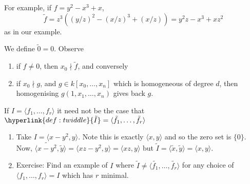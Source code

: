 \documentclass{article}
\begin{document}
For example, if $f = y^2 - x^3 + x$,
\begin{equation*}
    \tilde{f} = z^3 ((y/z)^2 - (x/z)^3 + (x/z)) = y^2 z - x^3 + x z^2
\end{equation*}
as in our example.

We define $\tilde{0} = 0$.
Observe
\begin{enumerate}[label=(\roman*)]
    \item if $f \neq 0$, then $x_0 \nmid \tilde{f}$, and conversely
    \item if $x_0 \nmid g$, and $g \in k[x_0, \dotsc, x_n]$ which is homogeneous of degree $d$, then homogenising $g(1, x_1, \dotsc, x_n)$ gives back $g$.
\end{enumerate}
\begin{warning}
    If $I = \langle f_1, \dotsc, f_r \rangle$ it need not be the case that $\hyperlink{def:twiddle}{\tilde{I}} = \langle \tilde{f_1}, \dotsc, \tilde{f_r}\rangle$
\end{warning}
\begin{eg}\leavevmode
    \begin{enumerate}[label=(\roman*)]
        \item Take $I = \langle x - y^2, y \rangle$.
            Note this is exactly $\langle x, y \rangle$ and so the zero set is $\{0\}$.
            Now, $\langle \widetilde{x - y^2}, \tilde{y} \rangle = \langle xz - y^2, y \rangle = \langle xz, y\rangle$ but $\tilde{I} = \langle \tilde{x}, \tilde{y} \rangle = \langle x, y \rangle$.
        \item Exercise: Find an example of $I$ where $\tilde{I} \neq \langle \tilde{f_1}, \dotsc, \tilde{f_r} \rangle$ for any choice of $\langle f_1, \dotsc, f_r \rangle = I$ which has $r$ minimal.
    \end{enumerate}
\end{eg}
\end{document}
